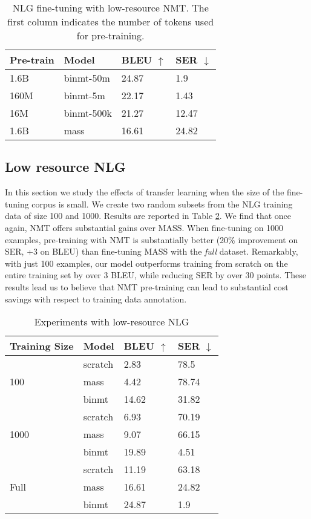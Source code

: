 \documentclass[11pt,a4paper]{article}
\begin{document}
\begin{table}[]
\centering
\begin{tabular}{l|l|l|l}
\hline
Pre-train & Model & BLEU $\uparrow$  & SER $\downarrow$   \\ \hline
1.6B & binmt-50m             & 24.87 & 1.9   \\
160M & binmt-5m             & 22.17 & 1.43  \\
16M & binmt-500k             & 21.27 & 12.47 \\ 
1.6B & mass                & 16.61 & 24.82 \\
\hline

\end{tabular}
\caption{NLG fine-tuning with low-resource NMT. The first column indicates the number of tokens used for pre-training.}
\label{results-nmt}
\end{table}



\subsection{Low resource NLG} \label{low-nlg}
In this section we study the effects of transfer learning when the size of the fine-tuning corpus is small. We create two random subsets from the NLG training data of size 100 and 1000. Results are reported in Table \ref{results-nlg}. We find that once again, NMT offers substantial gains over MASS.
When fine-tuning on 1000 examples, pre-training with NMT is substantially better (20\% improvement on SER, +3 on BLEU) than fine-tuning MASS with the \textit{full} dataset.
Remarkably, with just 100 examples, our model outperforms  training from scratch on the entire training set by over 3 BLEU, while reducing SER by over 30 points. These results lead us to believe that NMT pre-training can lead to substantial cost savings with respect to training data annotation.

\begin{table}[]
\centering
\begin{tabular}{l|l|ll} 
\hline
Training Size    & Model & BLEU $\uparrow$  & SER $\downarrow$   \\ \hline

& scratch                   & 2.83  & 78.5 \\ 
100 & mass                      & 4.42  & 78.74 \\ 
& binmt                              & 14.62 & 31.82 \\ \hline


& scratch                   & 6.93  & 70.19 \\ 
1000 & mass                      & 9.07  & 66.15 \\ 
& binmt                             & 19.89 & 4.51  \\ \hline


& scratch         & 11.19 & 63.18  \\ 
Full & mass    & 16.61 & 24.82 \\ 
& binmt & 24.87 & 1.9 \\ \hline
\end{tabular}
\caption{Experiments with low-resource NLG}
\label{results-nlg}
\end{table}
\end{document}
